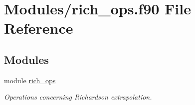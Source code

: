 \hypertarget{rich__ops_8f90}{}\section{Modules/rich\+\_\+ops.f90 File Reference}
\label{rich__ops_8f90}
\subsection*{Modules}
\begin{DoxyCompactItemize}
\item 
module \hyperlink{namespacerich__ops}{rich\+\_\+ops}
\begin{DoxyCompactList}\small\item\em Operations concerning Richardson extrapolation. \end{DoxyCompactList}\end{DoxyCompactItemize}
